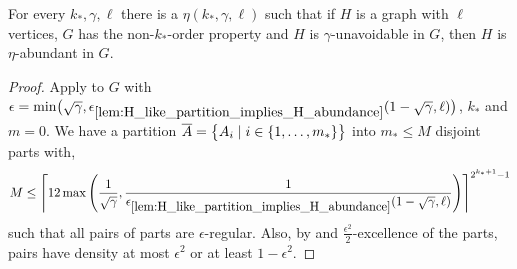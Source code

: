         \begin{theorem} \label{thm:property_testing_with_stable_partitions}
            For every $k_*, \gamma, \ell$ there is a $\eta(k_*, \gamma, \ell)$ such that if $H$ is a graph with $\ell$
            vertices, $G$ has the non-$k_*$-order property and $H$ is $\gamma$-unavoidable in $G$, then $H$ is
            $\eta$-abundant in $G$.
            \begin{proof}
                Apply  to $G$ with $\epsilon = \min \bigl( \sqrt{\gamma},
                    \epsilon_{\ref{lem:H_like_partition_implies_H_abundance}} ( 1 - \sqrt{\gamma}, \ell ) \bigr)$,
                $k_*$ and $m=0$.
                We have a partition $\overline{A} = \bigl\{ A_i \mid i \in \{ 1, \dots, m_* \} \bigr\}$ into $m_* \leq M$
                disjoint parts with,
                \[
                    M \leq \left\lceil 12 \max\left( \frac{1}{\sqrt{\gamma}}, \frac{1}{\epsilon_{\ref{lem:H_like_partition_implies_H_abundance}}
                        ( 1 - \sqrt{\gamma}, \ell )} \right) \right\rceil^{2^{k_*+1}-1}
                \]
                such that all pairs of parts are $\epsilon$-regular.
                Also, by  and $\frac{\epsilon^2}{2}$-excellence of the parts,
                pairs have density at most $\epsilon^2$ or at least $1 - \epsilon^2$.


\end{proof}
\end{theorem}
